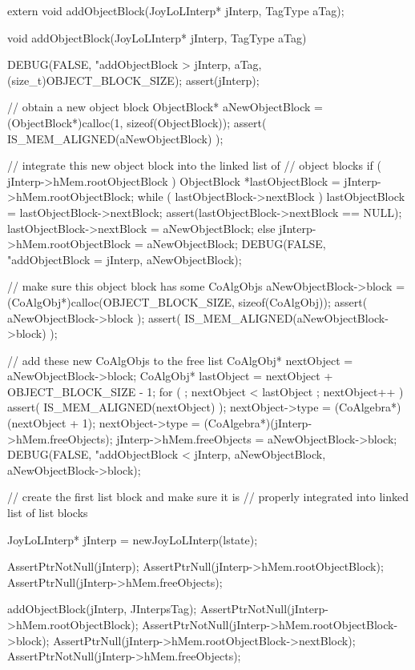 extern void addObjectBlock(JoyLoLInterp* jInterp, TagType aTag);
\stopCHeader


\startCCode
void addObjectBlock(JoyLoLInterp* jInterp, TagType aTag) {
  DEBUG(FALSE, "addObjectBlock > %
    jInterp, aTag, (size_t)OBJECT_BLOCK_SIZE);
  assert(jInterp);
  
  // obtain a new object block
  ObjectBlock* aNewObjectBlock = 
    (ObjectBlock*)calloc(1, sizeof(ObjectBlock));
  assert( IS_MEM_ALIGNED(aNewObjectBlock) );

  // integrate this new object block into the linked list of
  // object blocks
  if ( jInterp->hMem.rootObjectBlock ) {
    ObjectBlock *lastObjectBlock = jInterp->hMem.rootObjectBlock;
    while ( lastObjectBlock->nextBlock ) {
      lastObjectBlock = lastObjectBlock->nextBlock;
    }
    assert(lastObjectBlock->nextBlock == NULL);
    lastObjectBlock->nextBlock = aNewObjectBlock;
  } else {
    jInterp->hMem.rootObjectBlock = aNewObjectBlock;
  }
  DEBUG(FALSE, "addObjectBlock = %
    jInterp, aNewObjectBlock);

  // make sure this object block has some CoAlgObjs
  aNewObjectBlock->block = 
    (CoAlgObj*)calloc(OBJECT_BLOCK_SIZE, sizeof(CoAlgObj));
  assert( aNewObjectBlock->block );
  assert( IS_MEM_ALIGNED(aNewObjectBlock->block) );

  // add these new CoAlgObjs to the free list
  CoAlgObj* nextObject = aNewObjectBlock->block;
  CoAlgObj* lastObject = nextObject + OBJECT_BLOCK_SIZE - 1;
  for ( ; nextObject < lastObject ; nextObject++ ) {
    assert( IS_MEM_ALIGNED(nextObject) );
    nextObject->type = (CoAlgebra*)(nextObject + 1);
  }
  nextObject->type = (CoAlgebra*)(jInterp->hMem.freeObjects);
  jInterp->hMem.freeObjects = aNewObjectBlock->block;
  DEBUG(FALSE, "addObjectBlock < %
    jInterp, aNewObjectBlock, aNewObjectBlock->block);
}
\stopCCode

\startCTest
  // create the first list block and make sure it is 
  // properly integrated into linked list of list blocks

  JoyLoLInterp* jInterp = newJoyLoLInterp(lstate);

  AssertPtrNotNull(jInterp);
  AssertPtrNull(jInterp->hMem.rootObjectBlock);
  AssertPtrNull(jInterp->hMem.freeObjects);

  addObjectBlock(jInterp, JInterpsTag);
  AssertPtrNotNull(jInterp->hMem.rootObjectBlock);
  AssertPtrNotNull(jInterp->hMem.rootObjectBlock->block);
  AssertPtrNull(jInterp->hMem.rootObjectBlock->nextBlock);
  AssertPtrNotNull(jInterp->hMem.freeObjects);


